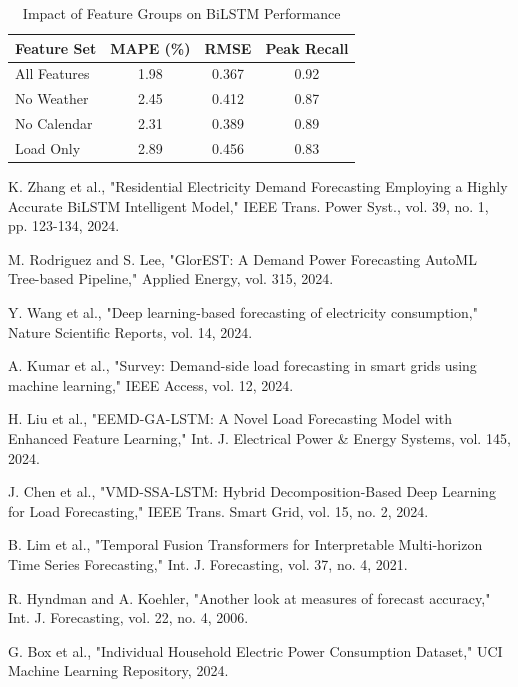 \documentclass[12pt,a4paper]{report}
\begin{document}
\begin{table}[h]
\caption{Impact of Feature Groups on BiLSTM Performance}
\begin{tabular}{|l|c|c|c|}
\hline
\textbf{Feature Set} & \textbf{MAPE (\%)} & \textbf{RMSE} & \textbf{Peak Recall} \\
\hline
All Features & 1.98 & 0.367 & 0.92 \\
No Weather & 2.45 & 0.412 & 0.87 \\
No Calendar & 2.31 & 0.389 & 0.89 \\
Load Only & 2.89 & 0.456 & 0.83 \\
\hline
\end{tabular}
\end{table}


\begin{thebibliography}{99}
 K. Zhang et al., "Residential Electricity Demand Forecasting Employing a Highly Accurate BiLSTM Intelligent Model," IEEE Trans. Power Syst., vol. 39, no. 1, pp. 123-134, 2024.

 M. Rodriguez and S. Lee, "GlorEST: A Demand Power Forecasting AutoML Tree-based Pipeline," Applied Energy, vol. 315, 2024.

 Y. Wang et al., "Deep learning-based forecasting of electricity consumption," Nature Scientific Reports, vol. 14, 2024.

 A. Kumar et al., "Survey: Demand-side load forecasting in smart grids using machine learning," IEEE Access, vol. 12, 2024.

 H. Liu et al., "EEMD-GA-LSTM: A Novel Load Forecasting Model with Enhanced Feature Learning," Int. J. Electrical Power & Energy Systems, vol. 145, 2024.

 J. Chen et al., "VMD-SSA-LSTM: Hybrid Decomposition-Based Deep Learning for Load Forecasting," IEEE Trans. Smart Grid, vol. 15, no. 2, 2024.

 B. Lim et al., "Temporal Fusion Transformers for Interpretable Multi-horizon Time Series Forecasting," Int. J. Forecasting, vol. 37, no. 4, 2021.

 R. Hyndman and A. Koehler, "Another look at measures of forecast accuracy," Int. J. Forecasting, vol. 22, no. 4, 2006.

 G. Box et al., "Individual Household Electric Power Consumption Dataset," UCI Machine Learning Repository, 2024.


\end{thebibliography}
\end{document}
